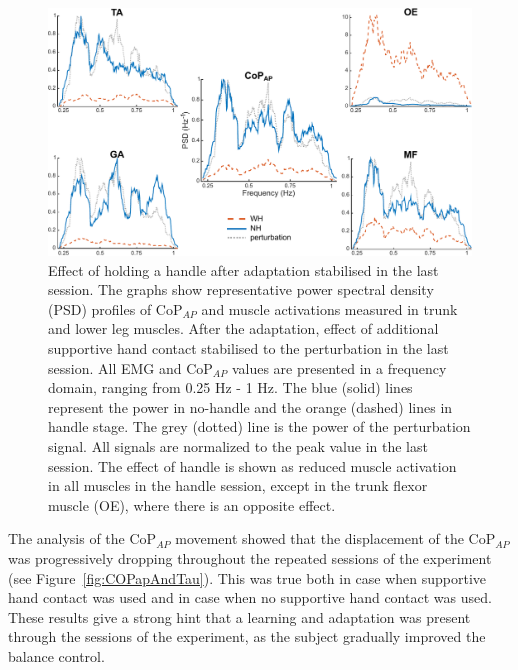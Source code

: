 \documentclass[final,5p,twocolumn]{elsarticle}
\begin{document}
\begin{figure}
	\begin{center}
		\includegraphics[width=\linewidth]{images/representativePSD_oneYaxis-v1.pdf}
		\caption{Effect of holding a handle after adaptation stabilised in the last session. The graphs show representative power spectral density (PSD) profiles of CoP$_{AP}$ and muscle activations measured in trunk and lower leg muscles. After the adaptation, effect of additional supportive hand contact stabilised to the perturbation in the last session. All EMG and CoP$_{AP}$ values are presented in a frequency domain, ranging from 0.25 Hz - 1 Hz. The blue (solid) lines represent the power in no-handle and the orange (dashed) lines in handle stage. The grey (dotted) line is the power of the perturbation signal. All signals are normalized to the peak value in the last session. The effect of handle is shown as reduced muscle activation in all muscles in the handle session, except in the trunk flexor muscle (OE), where there is an opposite effect.}
		\label{fig:representativePSD}
	\end{center}
\end{figure}

The analysis of the CoP$_{AP}$ movement showed that the displacement of the CoP$_{AP}$ was progressively dropping throughout the repeated sessions of the experiment (see Figure~\ref{fig:COPapAndTau}). This was true both in case when supportive hand contact was used and in case when no supportive hand contact was used. These results give a strong hint that a learning and adaptation was present through the sessions of the experiment, as the subject gradually improved the balance control.
\end{document}

